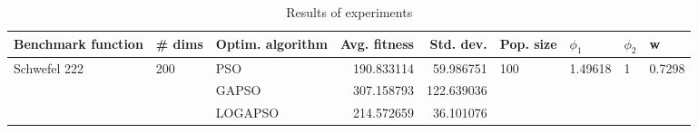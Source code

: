 \begin{table}
\centering
\caption{Results of experiments}
\begin{tabular}{lllrrllll}
\toprule
           Benchmark function &              \# dims & Optim. algorithm &  Avg. fitness &  Std. dev. &            Pop. size &               $\phi_{1}$ &         $\phi_{2}$ &                       w \\
\midrule
\multirow{3}{*}{Schwefel 222} & \multirow{3}{*}{200} &              PSO &    190.833114 &  59.986751 & \multirow{3}{*}{100} & \multirow{3}{*}{1.49618} & \multirow{3}{*}{1} & \multirow{3}{*}{0.7298} \\
                              &                      &            GAPSO &    307.158793 & 122.639036 &                      &                          &                    &                         \\
                              &                      &          LOGAPSO &    214.572659 &  36.101076 &                      &                          &                    &                         \\
\bottomrule
\end{tabular}
\end{table}
